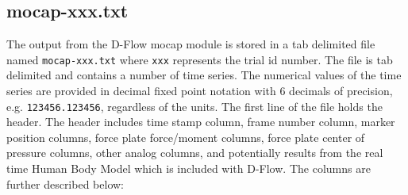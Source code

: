 \documentclass[fleqn,10pt]{wlpeerj}
\begin{document}
\subsection*{mocap-xxx.txt}

The output from the D-Flow mocap module is stored in a tab delimited file named
\verb+mocap-xxx.txt+ where \verb+xxx+ represents the trial id number. The file
is tab delimited and contains a number of time series. The numerical values of
the time series are provided in decimal fixed point notation with 6 decimals of
precision, e.g. \verb|123456.123456|, regardless of the units. The first line
of the file holds the header. The header includes time stamp column, frame
number column, marker position columns, force plate force/moment columns, force
plate center of pressure columns, other analog columns, and potentially results
from the real time Human Body Model \cite{Bogert2013} which is included with
D-Flow. The columns are further described below:
%
\end{document}
